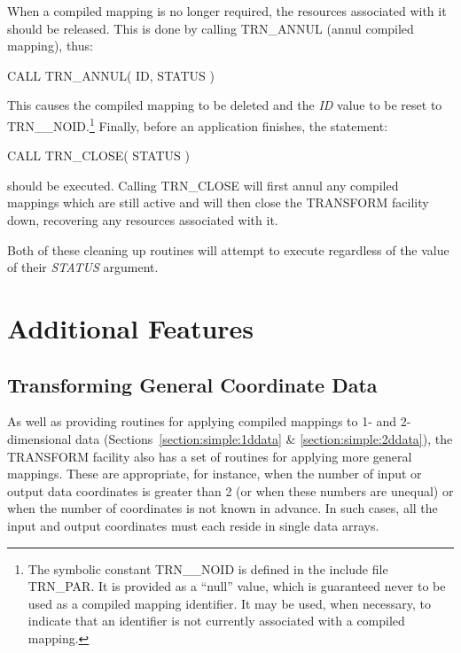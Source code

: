 \documentclass[twoside,nolof,11pt]{starlink}
\providecommand{\name}[1]{\small{#1}}
\providecommand{\fortvar}[1]{\emph{#1}}
\begin{document}
\label{section:simple:cleanup}

When a compiled mapping is no longer required, the resources associated with
it should be released.
This is done by calling \name{TRN\_ANNUL} (annul compiled mapping), thus:

\begin{terminalv}
CALL TRN_ANNUL( ID, STATUS )
\end{terminalv}

This causes the compiled mapping to be deleted and the \fortvar{ID} value
to be reset to \name{TRN\_\_NOID}.\footnote{
The symbolic constant \name{TRN\_\_NOID} is defined in the include file
\name{TRN\_PAR}.
It is provided as a ``null'' value, which is guaranteed never to be used as
a compiled mapping identifier.
It may be used, when necessary, to indicate that an identifier is not
currently associated with a compiled mapping.}
Finally, before an application finishes, the statement:

\begin{terminalv}
CALL TRN_CLOSE( STATUS )
\end{terminalv}

should be executed.
Calling \name{TRN\_CLOSE} will first annul any compiled mappings which are
still active and will then close the \name{TRANSFORM} facility down,
recovering any resources associated with it.

Both of these cleaning up routines will attempt to execute regardless of the
value of their \fortvar{STATUS} argument.


\section{Additional Features}

\subsection{Transforming General Coordinate Data}

\label{section:additional:generaldata}

As well as providing routines for applying compiled mappings to 1- and
2-dimensional data (Sections~\ref{section:simple:1ddata} \&
\ref{section:simple:2ddata}), the \name{TRANSFORM} facility also has a set
of routines for applying more general mappings.
These are appropriate, for instance, when the number of input or output data
coordinates is greater than 2 (or when these numbers are unequal) or when
the number of coordinates is not known in advance.
In such cases, all the input and output coordinates must each reside in
single data arrays.
\end{document}
